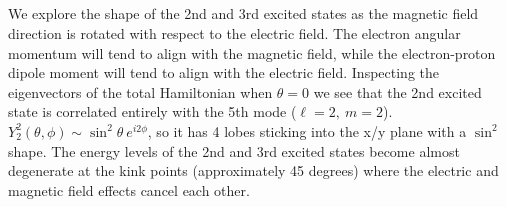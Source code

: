 \documentclass[a4paper,12pt]{article}
\numberwithin{equation}{section}
\begin{document}
\subsection{}
We explore the shape of the 2nd and 3rd excited states as the magnetic field direction is rotated with respect to the electric field.
The electron angular momentum will tend to align with the magnetic field, while the electron-proton dipole moment will tend to align with the electric field.
Inspecting the eigenvectors of the total Hamiltonian when $\theta=0$ we see that the 2nd excited state is correlated entirely with the 5th mode ($\ell=2,\ m=2$).
$Y_2^2(\theta, \phi)\sim \sin^2 \theta\ e^{i2\phi}$, so it has 4 lobes sticking into the x/y plane with a $\sin^2$ shape. 
The energy levels of the 2nd and 3rd excited states become almost degenerate at the kink points (approximately 45 degrees) where the electric and magnetic field effects cancel each other.
\end{document}
